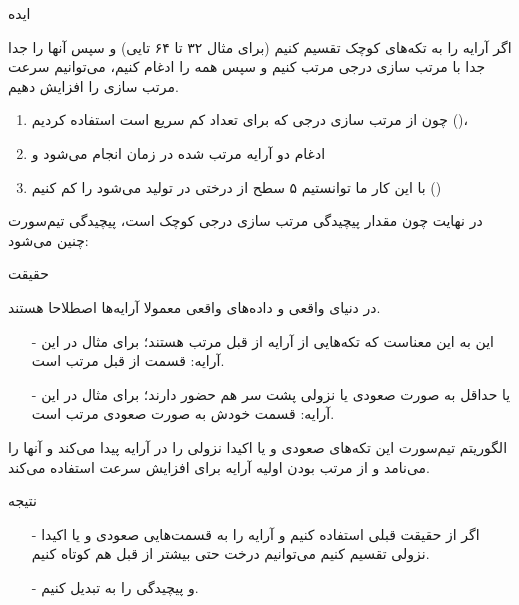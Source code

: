 \begin{frame}{ایده}
\begin{center}
{\large اگر آرایه را به تکه‌های کوچک تقسیم کنیم‌ (برای مثال ۳۲ تا ۶۴ تایی) و سپس آنها را جدا جدا با مرتب‌ سازی درجی مرتب کنیم و سپس همه را ادغام کنیم، می‌توانیم سرعت مرتب سازی را افزایش دهیم.}
\end{center}

\begin{enumerate}\itemr
\item
چون از مرتب سازی درجی که برای تعداد کم سریع است استفاده کردیم ()،
\item
ادغام دو آرایه مرتب شده در زمان 
انجام می‌شود و

\item 
با این کار ما توانستیم ۵ سطح از درختی در  تولید می‌شود را کم کنیم ()
\end{enumerate}

\begin{center}
{\large در نهایت چون مقدار پیچیدگی مرتب سازی درجی کوچک است، پیچیدگی  تیم‌سورت چنین می‌شود: }
\end{center}
\end{frame}

\begin{frame}{حقیقت}
\begin{center}
{\large در دنیای واقعی و داده‌های واقعی معمولا آرایه‌ها اصطلاحا 
هستند.}
\end{center}
\begin{itemize}\itemr
\item[-]
این به این معناست که تکه‌هایی از آرایه از قبل مرتب هستند؛ برای مثال در این آرایه:
\m{[5, 4, 1, 2, 3]}
قسمت 
\m{[1, 2, 3]}
از قبل مرتب است.
\item[-]
یا حداقل به صورت صعودی یا نزولی پشت سر هم حضور دارند؛ برای مثال در این آرایه:
\m{[6, 4, 1, 2, 3, 5, 7]}
قسمت
\m{[1, 2, 3, 5, 7]}
خودش به صورت صعودی مرتب است.
\end{itemize}

\begin{center}
{\large الگوریتم تیم‌سورت این تکه‌های صعودی و یا اکیدا نزولی را در آرایه پیدا می‌کند و آنها را  می‌نامد و از مرتب بودن اولیه آرایه برای افزایش سرعت استفاده می‌کند.}
\end{center}
\end{frame}

\begin{frame}{نتیجه}
\begin{itemize}\itemr
\item[-]
اگر از حقیقت قبلی استفاده کنیم و آرایه را به قسمت‌هایی صعودی و یا اکیدا نزولی تقسیم کنیم می‌توانیم درخت  حتی بیشتر از قبل هم کوتاه کنیم.

\item[-]
و پیچیدگی را به 
تبدیل کنیم.
\end{itemize}
\end{frame}
